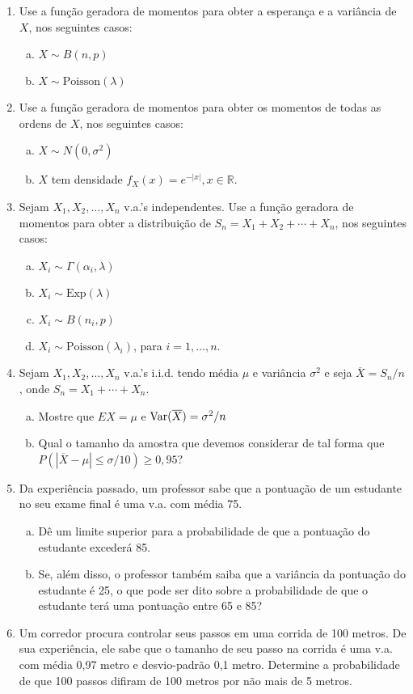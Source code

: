 \documentclass[../Notas.tex]{subfiles}
\begin{document}
\begin{enumerate}
    \item Use a função geradora de momentos para obter a esperança e a variância de $X$, nos seguintes casos:
    \begin{enumerate}[a)]
    \item $X\sim B(n, p)$ 
    \item $X\sim\text{Poisson}(\lambda)$
    \end{enumerate}
    \item Use a função geradora de momentos para obter os momentos de todas as ordens de $X$, nos seguintes casos:
    \begin{enumerate}[a)]
    \item $X\sim N(0,\sigma^2)$ 
    \item $X$ tem densidade $f_X(x) = e^{-|x|}, x \in\mathbb{R}$.
    \end{enumerate}
    \item Sejam $X_1,X_2,\dots,X_n$ v.a.’s independentes. Use a função geradora de momentos para obter a distribuição de $S_n = X_1 + X_2 + \cdots + X_n$, nos seguintes casos:
    \begin{enumerate}[a)]
    \item $X_i\sim\Gamma(\alpha_i,\lambda)$
    \item $X_i\sim\text{Exp}(\lambda)$
    \item $X_i\sim B(n_i , p)$
    \item $X_i\sim\text{Poisson}(\lambda_i)$, para $i = 1,\dots, n.$
    \end{enumerate}
    \item Sejam $X_1, X_2,\dots, X_n$ v.a.'s i.i.d. tendo média $\mu$ e variância $\sigma^2$ e seja $\overline{X} = S_n/n$, onde $S_n = X_1 + \cdots + X_n$.
    \begin{enumerate}[a)]
    \item Mostre que $EX = \mu$ e $\text{Var}(\overline{X}) = \sigma^2/n$
    \item Qual o tamanho da amostra que devemos considerar de tal forma que $P(|\overline{X} - \mu| \leq \sigma/10) \geq 0,95$?
    \end{enumerate}
    \item Da experiência passado, um professor sabe que a pontuação de um estudante no seu exame final é uma v.a. com média 75.
    \begin{enumerate}[a)]
    \item Dê um limite superior para a probabilidade de que a pontuação do estudante excederá 85.
    \item Se, além disso, o professor também saiba que a variância da pontuação do estudante é 25, o que pode ser dito sobre a probabilidade de que o estudante terá uma pontuação entre 65 e 85?
    \end{enumerate}
    \item Um corredor procura controlar seus passos em uma corrida de 100 metros. De sua experiência, ele sabe que o tamanho de seu passo na corrida é uma v.a. com média 0,97 metro e desvio-padrão 0,1 metro. Determine a probabilidade de que 100 passos difiram de 100 metros por não mais de 5 metros.
    
    
    
    
    
\end{enumerate}
\end{document}
